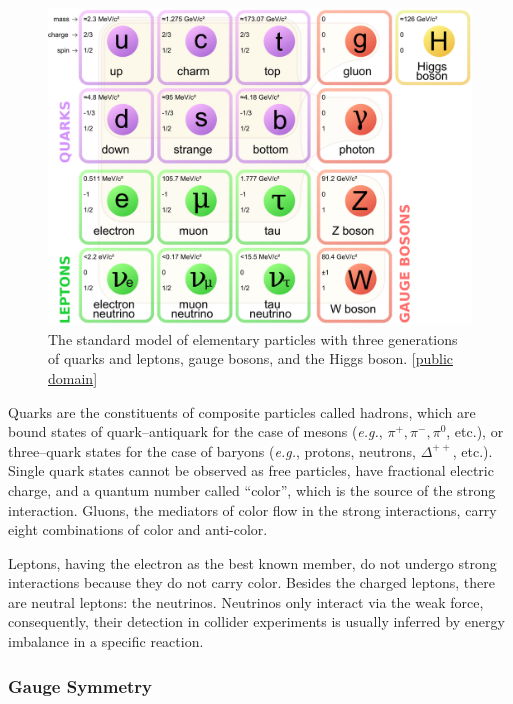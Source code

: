 \begin{figure}[hb!!]
\centering
\includegraphics[scale=0.2]{figures/theory/standard.png}
\caption[Elementary particles in the standard model]{The standard model of elementary particles with three generations of quarks and leptons, gauge bosons, and the Higgs boson. [\href{http://tinyurl.com/loorj2q}{public domain}]}
\label{smplot}
\end{figure}

Quarks are the constituents of composite particles called hadrons, which are bound states of quark--antiquark for the case of mesons ({\it e.g.}, $\pi^+, \pi^-, \pi^0$, etc.), or three--quark states for the case of baryons ({\it e.g.}, protons, neutrons, $\Delta^{++}$, etc.). Single quark states cannot be observed as free particles, have fractional electric charge, and a quantum number called ``color'', which is the source of the strong interaction. Gluons, the mediators of color flow in the strong interactions, carry eight combinations of color and anti-color. 

Leptons, having the electron as the best known member, do not undergo strong interactions because they do not carry color. Besides the charged leptons, there are neutral leptons: the neutrinos. Neutrinos only interact via the weak force, consequently, their detection in collider experiments is usually inferred by energy imbalance in a specific reaction. 

\subsubsection*{Gauge Symmetry}

